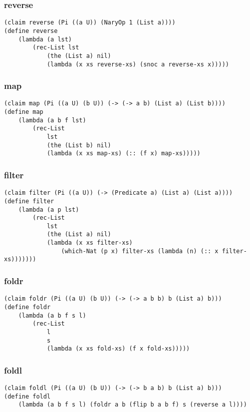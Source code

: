 \subsubsection{reverse} \label{code:reverse}
\begin{verbatim}
(claim reverse (Pi ((a U)) (NaryOp 1 (List a))))
(define reverse
    (lambda (a lst)
        (rec-List lst
            (the (List a) nil)
            (lambda (x xs reverse-xs) (snoc a reverse-xs x)))))
\end{verbatim}

\subsubsection{map} \label{code:map}
\begin{verbatim}
(claim map (Pi ((a U) (b U)) (-> (-> a b) (List a) (List b))))
(define map
    (lambda (a b f lst)
        (rec-List
            lst
            (the (List b) nil)
            (lambda (x xs map-xs) (:: (f x) map-xs)))))
\end{verbatim}

\subsubsection{filter} \label{code:filter}
\begin{verbatim}
(claim filter (Pi ((a U)) (-> (Predicate a) (List a) (List a))))
(define filter
    (lambda (a p lst)
        (rec-List
            lst
            (the (List a) nil)
            (lambda (x xs filter-xs)
                (which-Nat (p x) filter-xs (lambda (n) (:: x filter-xs)))))))
\end{verbatim}

\subsubsection{foldr} \label{code:foldr}
\begin{verbatim}
(claim foldr (Pi ((a U) (b U)) (-> (-> a b b) b (List a) b)))
(define foldr
    (lambda (a b f s l)
        (rec-List 
            l
            s
            (lambda (x xs fold-xs) (f x fold-xs)))))
\end{verbatim}

\subsubsection{foldl} \label{code:foldl}
\begin{verbatim}
(claim foldl (Pi ((a U) (b U)) (-> (-> b a b) b (List a) b)))
(define foldl
    (lambda (a b f s l) (foldr a b (flip b a b f) s (reverse a l))))
\end{verbatim}

